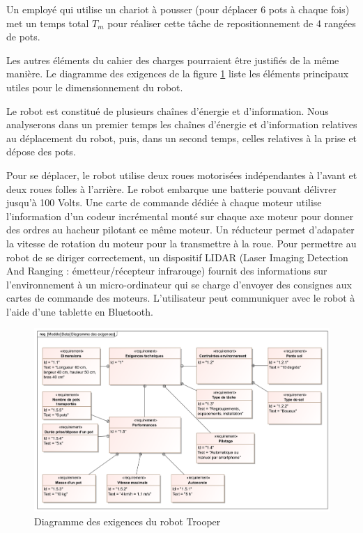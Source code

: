 Un employé qui utilise un chariot à pousser (pour déplacer 6 pots à chaque fois) met un temps total $T_m$ pour réaliser cette tâche de repositionnement de 4 rangées de pots.


Les autres éléments du cahier des charges pourraient être justifiés de la même manière. Le diagramme des exigences de la figure \ref{fig04} liste les éléments principaux utiles pour le dimensionnement du robot.

Le robot est constitué de plusieurs chaînes d'énergie et d'information. Nous analyserons dans un premier temps les chaînes d'énergie et d'information relatives au déplacement du robot, puis, dans un second temps, celles relatives à la prise et dépose des pots.

Pour se déplacer, le robot utilise deux roues motorisées indépendantes à l'avant et deux roues folles à l'arrière. Le robot embarque une batterie pouvant délivrer jusqu'à 100 Volts. Une carte de commande dédiée à chaque moteur utilise l'information d'un codeur incrémental monté sur chaque axe moteur pour donner des ordres au hacheur pilotant ce même moteur. Un réducteur permet d'adapater la vitesse de rotation du moteur pour la transmettre à la roue. Pour permettre au robot de se diriger correctement, un dispositif LIDAR (Laser Imaging Detection And Ranging : émetteur/récepteur infrarouge) fournit des informations sur l'environnement à un micro-ordinateur qui se charge d'envoyer des consignes aux cartes de commande des moteurs. L'utilisateur peut communiquer avec le robot à l'aide d'une tablette en Bluetooth.


\newpage

\begin{figure}[ht!]
\begin{center}
 \includegraphics[width=0.8\linewidth]{img/fig04}
\end{center}
\caption{Diagramme des exigences du robot Trooper}
\label{fig04}
\end{figure}

